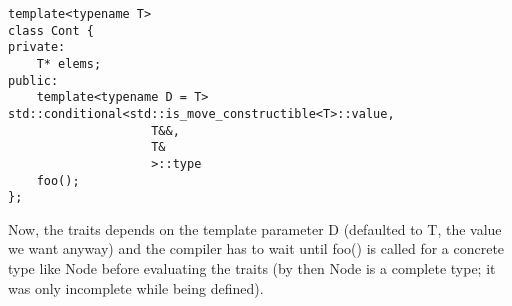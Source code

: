 \begin{lstlisting}[style=styleCXX]
template<typename T>
class Cont {
private:
	T* elems;
public:
	template<typename D = T> std::conditional<std::is_move_constructible<T>::value,
					T&&,
					T&
					>::type
	foo();
};
\end{lstlisting}

Now, the traits depends on the template parameter D (defaulted to T, the value we want anyway) and the compiler has to wait until foo() is called for a concrete type like Node before evaluating the traits (by then Node is a complete type; it was only incomplete while being defined).











